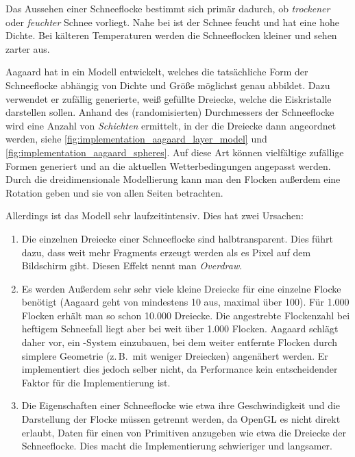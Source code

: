 Das Aussehen einer Schneeflocke bestimmt sich primär dadurch, ob
\emph{trockener} oder \emph{feuchter} Schnee vorliegt. Nahe bei
 ist der Schnee feucht und hat eine hohe
Dichte. Bei kälteren Temperaturen werden die Schneeflocken kleiner und
sehen zarter aus.

Aagaard hat in \cite{Aagaard2004} ein Modell entwickelt, welches die
tatsächliche Form der Schneeflocke abhängig von Dichte und Größe
möglichst genau abbildet. Dazu verwendet er zufällig generierte, weiß
gefüllte Dreiecke, welche die Eiskristalle darstellen sollen. Anhand
des (randomisierten) Durchmessers der Schneeflocke wird eine Anzahl
von \emph{Schichten} ermittelt, in der die Dreiecke dann angeordnet werden,
siehe \autoref{fig:implementation_aagaard_layer_model} und
\autoref{fig:implementation_aagaard_spheres}. Auf diese Art können
vielfältige zufällige Formen generiert und an die aktuellen
Wetterbedingungen angepasst werden. Durch die dreidimensionale
Modellierung kann man den Flocken außerdem eine Rotation geben und sie
von allen Seiten betrachten.

Allerdings ist das Modell sehr laufzeitintensiv. Dies hat zwei Ursachen:

\begin{enumerate}
\item Die einzelnen Dreiecke einer Schneeflocke sind
halbtransparent. Dies führt dazu, dass weit mehr Fragments erzeugt
werden als es Pixel auf dem Bildschirm gibt. Diesen Effekt nennt man
\emph{Overdraw}.
\item Es werden Außerdem sehr sehr viele kleine Dreiecke für eine einzelne
Flocke benötigt (Aagaard geht von mindestens 10 aus, maximal über
100). Für 1.000 Flocken erhält man so schon 10.000 Dreiecke. Die
angestrebte Flockenzahl bei heftigem Schneefall liegt aber bei weit
über 1.000 Flocken. Aagaard schlägt daher vor, ein -System einzubauen, bei dem weiter entfernte Flocken durch
simplere Geometrie (z.\,B.\ mit weniger Dreiecken) angenähert werden. Er
implementiert dies jedoch selber nicht, da Performance kein
entscheidender Faktor für die Implementierung ist.
\item Die Eigenschaften einer Schneeflocke wie etwa ihre Geschwindigkeit
und die Darstellung der Flocke müssen getrennt werden, da OpenGL es
nicht direkt erlaubt, Daten für einen  von
Primitiven anzugeben wie etwa die Dreiecke der Schneeflocke. Dies
macht die Implementierung schwieriger und langsamer.
\end{enumerate}


